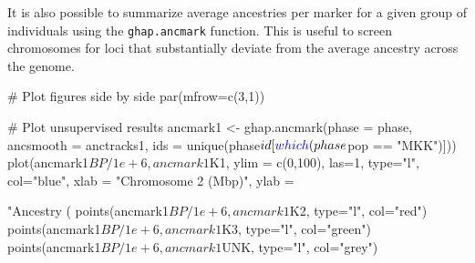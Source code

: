 \documentclass[
]{article}
\newenvironment{Shaded}{}{}
\newcommand{\CommentTok}[1]{\textcolor[rgb]{0.00,0.50,0.00}{#1}}
\newcommand{\DataTypeTok}[1]{#1}
\newcommand{\DecValTok}[1]{#1}
\newcommand{\FloatTok}[1]{#1}
\newcommand{\KeywordTok}[1]{\textcolor[rgb]{0.00,0.00,1.00}{#1}}
\newcommand{\NormalTok}[1]{#1}
\newcommand{\OperatorTok}[1]{#1}
\newcommand{\StringTok}[1]{\textcolor[rgb]{0.00,0.50,0.50}{#1}}
\begin{document}
It is also possible to summarize average ancestries per marker for a
given group of individuals using the \texttt{ghap.ancmark} function.
This is useful to screen chromosomes for loci that substantially deviate
from the average ancestry across the genome.

\begin{Shaded}
\begin{Highlighting}[]
\CommentTok{# Plot figures side by side}
\KeywordTok{par}\NormalTok{(}\DataTypeTok{mfrow=}\KeywordTok{c}\NormalTok{(}\DecValTok{3}\NormalTok{,}\DecValTok{1}\NormalTok{))}

\CommentTok{# Plot unsupervised results}
\NormalTok{ancmark1 <-}\StringTok{ }\KeywordTok{ghap.ancmark}\NormalTok{(}\DataTypeTok{phase =}\NormalTok{ phase, }\DataTypeTok{ancsmooth =}\NormalTok{ anctracks1,}
                         \DataTypeTok{ids =} \KeywordTok{unique}\NormalTok{(phase}\OperatorTok{$}\NormalTok{id[}\KeywordTok{which}\NormalTok{(phase}\OperatorTok{$}\NormalTok{pop }\OperatorTok{==}\StringTok{ "MKK"}\NormalTok{)]))}
\KeywordTok{plot}\NormalTok{(ancmark1}\OperatorTok{$}\NormalTok{BP}\OperatorTok{/}\FloatTok{1e+6}\NormalTok{, ancmark1}\OperatorTok{$}\NormalTok{K1, }\DataTypeTok{ylim =} \KeywordTok{c}\NormalTok{(}\DecValTok{0}\NormalTok{,}\DecValTok{100}\NormalTok{), }\DataTypeTok{las=}\DecValTok{1}\NormalTok{, }\DataTypeTok{type=}\StringTok{"l"}\NormalTok{, }\DataTypeTok{col=}\StringTok{"blue"}\NormalTok{,}
     \DataTypeTok{xlab =} \StringTok{"Chromosome 2 (Mbp)"}\NormalTok{, }\DataTypeTok{ylab =} \StringTok{"Ancestry (%
\KeywordTok{points}\NormalTok{(ancmark1}\OperatorTok{$}\NormalTok{BP}\OperatorTok{/}\FloatTok{1e+6}\NormalTok{, ancmark1}\OperatorTok{$}\NormalTok{K2, }\DataTypeTok{type=}\StringTok{"l"}\NormalTok{, }\DataTypeTok{col=}\StringTok{"red"}\NormalTok{)}
\KeywordTok{points}\NormalTok{(ancmark1}\OperatorTok{$}\NormalTok{BP}\OperatorTok{/}\FloatTok{1e+6}\NormalTok{, ancmark1}\OperatorTok{$}\NormalTok{K3, }\DataTypeTok{type=}\StringTok{"l"}\NormalTok{, }\DataTypeTok{col=}\StringTok{"green"}\NormalTok{)}
\KeywordTok{points}\NormalTok{(ancmark1}\OperatorTok{$}\NormalTok{BP}\OperatorTok{/}\FloatTok{1e+6}\NormalTok{, ancmark1}\OperatorTok{$}\NormalTok{UNK, }\DataTypeTok{type=}\StringTok{"l"}\NormalTok{, }\DataTypeTok{col=}\StringTok{"grey"}\NormalTok{)}

}
\end{Highlighting}
\end{Shaded}
\end{document}
